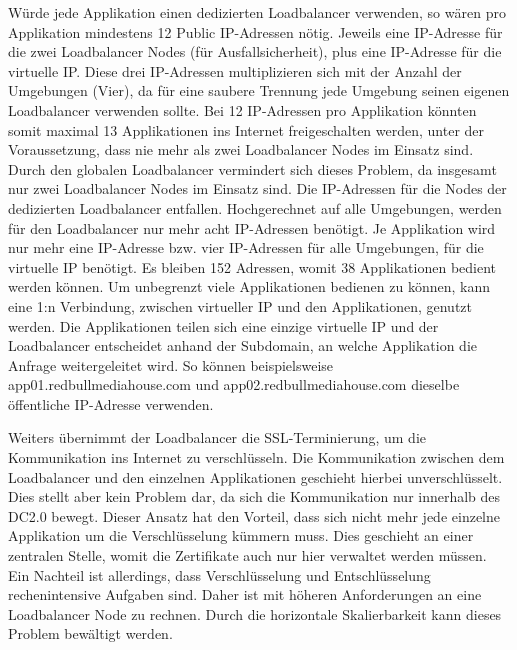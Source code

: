 Würde jede Applikation einen dedizierten Loadbalancer verwenden, so wären pro Applikation mindestens 12 Public IP-Adressen nötig. Jeweils eine IP-Adresse für die zwei Loadbalancer Nodes (für Ausfallsicherheit), plus eine IP-Adresse für die virtuelle IP. Diese drei IP-Adressen multiplizieren sich mit der Anzahl der Umgebungen (Vier), da für eine saubere Trennung jede Umgebung seinen eigenen Loadbalancer verwenden sollte. Bei 12 IP-Adressen pro Applikation könnten somit maximal 13 Applikationen ins Internet freigeschalten werden, unter der Voraussetzung, dass nie mehr als zwei Loadbalancer Nodes im Einsatz sind.
Durch den globalen Loadbalancer vermindert sich dieses Problem, da insgesamt nur zwei Loadbalancer Nodes im Einsatz sind. Die IP-Adressen für die Nodes der dedizierten Loadbalancer entfallen. Hochgerechnet auf alle Umgebungen, werden für den Loadbalancer nur mehr acht IP-Adressen benötigt. Je Applikation wird nur mehr eine IP-Adresse bzw. vier IP-Adressen für alle Umgebungen, für die virtuelle IP benötigt. Es bleiben 152 Adressen, womit 38 Applikationen bedient werden können. Um unbegrenzt viele Applikationen bedienen zu können, kann eine 1:n Verbindung, zwischen virtueller IP und den Applikationen, genutzt werden. Die Applikationen teilen sich eine einzige virtuelle IP und der Loadbalancer entscheidet anhand der Subdomain, an welche Applikation die Anfrage weitergeleitet wird. So können beispielsweise app01.redbullmediahouse.com und app02.redbullmediahouse.com dieselbe öffentliche IP-Adresse verwenden. 

Weiters übernimmt der Loadbalancer die SSL-Terminierung, um die Kommunikation ins Internet zu verschlüsseln. Die Kommunikation zwischen dem Loadbalancer und den einzelnen Applikationen geschieht hierbei unverschlüsselt. Dies stellt aber kein Problem dar, da sich die Kommunikation nur innerhalb des DC2.0 bewegt. Dieser Ansatz hat den Vorteil, dass sich nicht mehr jede einzelne Applikation um die Verschlüsselung kümmern muss. Dies geschieht an einer zentralen Stelle, womit die Zertifikate auch nur hier verwaltet werden müssen. Ein Nachteil ist allerdings, dass Verschlüsselung und Entschlüsselung rechenintensive Aufgaben sind. Daher ist mit höheren Anforderungen an eine Loadbalancer Node zu rechnen. Durch die horizontale Skalierbarkeit kann dieses Problem bewältigt werden.

